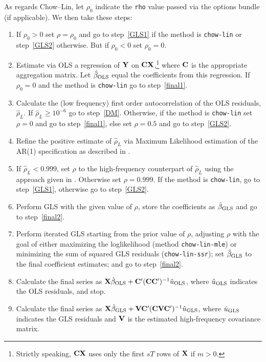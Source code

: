 As regards Chow--Lin, let $\rho_0$ indicate the \texttt{rho} value
passed via the options bundle (if applicable). We then take these
steps:
\begin{enumerate}
\item If $\rho_0 > 0$ set $\rho = \rho_0$ and go to step~\ref{GLS1} if
  the method is \texttt{chow-lin} or step~\ref{GLS2} otherwise.  But
  if $\rho_0 < 0$ set $\rho_0 = 0$.
\item Estimate via OLS a regression of $\mathbf{Y}$ on
  $\mathbf{CX}$,\footnote{Strictly speaking, $\mathbf{CX}$ uses only the first $sT$
    rows of $\mathbf{X}$ if $m > 0$.} where $\mathbf{C}$ is the appropriate
  aggregation matrix. Let $\hat{\beta}_{\rm OLS}$ equal the
  coefficients from this regression.  If $\rho_0 = 0$ and the method
  is \texttt{chow-lin} go to step~\ref{final1}.
\item Calculate the (low frequency) first order autocorrelation of the
  OLS residuals, $\hat{\rho}_L$. If $\hat{\rho}_L \ge 10^{-6}$ go to
  step~\ref{DM}. Otherwise, if the method is \texttt{chow-lin} set
  $\rho = 0$ and go to step~\ref{final1}, else set $\rho=0.5$ and go
  to step~\ref{GLS2}.
\item Refine the positive estimate of $\hat{\rho}_L$ via Maximum
  Likelihood estimation of the AR(1) specification as described in
  \cite{davidson-mackinnon04}.\label{DM}
\item If $\hat{\rho}_L < 0.999$, set $\rho$ to the high-frequency
  counterpart of $\hat{\rho}_L$ using the approach given in
  \cite{chowlin71}. Otherwise set $\rho = 0.999$. If the method is
  \texttt{chow-lin}, go to step~\ref{GLS1}, otherwise go to
  step~\ref{GLS2}.
\item Perform GLS with the given value of $\rho$, store the
  coefficients as $\hat{\beta}_{\rm GLS}$ and go to
  step~\ref{final2}.\label{GLS1}
\item Perform iterated GLS starting from the prior value of $\rho$,
  adjusting $\rho$ with the goal of either maximizing the
  loglikelihood (method \texttt{chow-lin-mle}) or minimizing the sum
  of squared GLS residuals (\texttt{chow-lin-ssr}); set
  $\hat{\beta}_{\rm GLS}$ to the final coefficient estimates; and go
  to step~\ref{final2}.\label{GLS2}
\item Calculate the final series as
  $\mathbf{X}\hat{\beta}_{\rm OLS} + \mathbf{C}'(\mathbf{C}\mathbf{C}')^{-1}\hat{u}_{\rm OLS}$,
  where $\hat{u}_{\rm OLS}$ indicates the OLS residuals, and stop.
  \label{final1}
\item Calculate the final series as
  $\mathbf{X}\hat{\beta}_{\rm GLS} + \mathbf{V}\mathbf{C}'(\mathbf{C}\mathbf{V}\mathbf{C}')^{-1}\hat{u}_{\rm
    GLS}$, where $\hat{u}_{\rm GLS}$ indicates the GLS residuals and
  $\mathbf{V}$ is the estimated high-frequency covariance matrix.
  \label{final2}
\end{enumerate}

